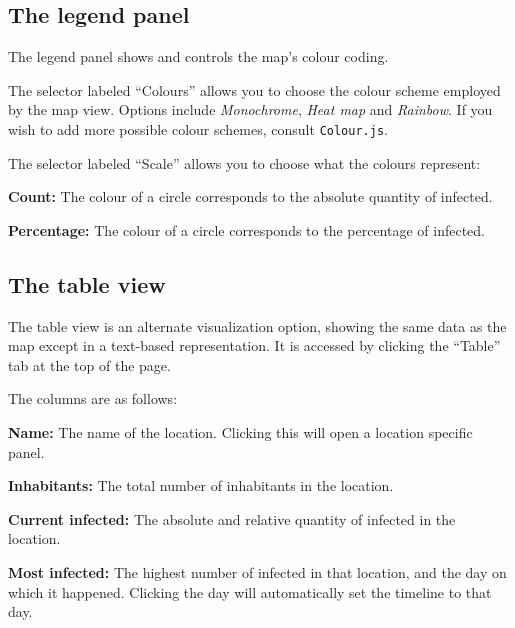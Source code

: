 \subsection{The legend panel}
\label{sub:legend}

The legend panel shows and controls the map's colour coding.

The selector labeled ``Colours'' allows you to choose the colour scheme employed by the map view. Options include \textit{Monochrome}, \textit{Heat map} and \textit{Rainbow}. If you wish to add more possible colour schemes, consult \texttt{Colour.js}.

The selector labeled ``Scale'' allows you to choose what the colours represent:
\begin{compactitem}
	
	\item \textbf{Count:} The colour of a circle corresponds to the absolute quantity of infected.
	\item \textbf{Percentage:} The colour of a circle corresponds to the percentage of infected.
	
\end{compactitem}

\subsection{The table view}

The table view is an alternate visualization option, showing the same data as the map except in a text-based representation. It is accessed by clicking the ``Table'' tab at the top of the page.

The columns are as follows:

\begin{compactitem}
	
	\item \textbf{Name:} The name of the location. Clicking this will open a location specific panel.
	\item \textbf{Inhabitants:} The total number of inhabitants in the location.
	\item \textbf{Current infected:} The absolute and relative quantity of infected in the location.
	\item \textbf{Most infected:} The highest number of infected in that location, and the day on which it happened. Clicking the day will automatically set the timeline to that day.
	
\end{compactitem}


